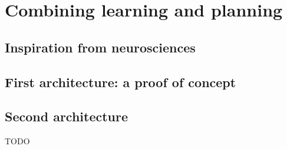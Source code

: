 \documentclass[english,a4paper,11pt,twoside]{StyleThese}
\begin{document}
\setcounter{chapter}{6} %
\dominitoc
\faketableofcontents
\fi

\chapter{Combining learning and planning}
\minitoc

\section{Inspiration from neurosciences}

\section{First architecture: a proof of concept}

\section{Second architecture}

TODO


\ifdefined{}
\else


\end{document}
